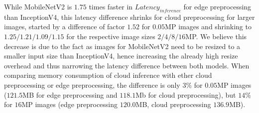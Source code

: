 While MobileNetV2 is $1.75$ times faster in $Latency_{inference}$ for edge preprocessing than InceptionV4, this latency difference shrinks for cloud preprocessing for larger images, started by a difference of factor $1.52$ for $0.05$MP images and shrinking to $1.25/1.21/1.09/1.15$ for the respective image sizes $2/4/8/16$MP.
We believe this decrease is due to the fact as images for MobileNetV2 need to be resized to a smaller input size than InceptionV4, hence increasing the already high resize overhead and thus narrowing the latency difference between both models.
When comparing memory consumption of cloud inference with ether cloud preprocessing or edge preprocessing, the difference is only $3\%$ for  $0.05$MP images ($121.5$MB for edge preprocessing and $118.1$Mb for cloud preprocessing), but $14\%$ for $16$MP images (edge preprocessing $120.0$MB, cloud preprocessing $136.9$MB).





